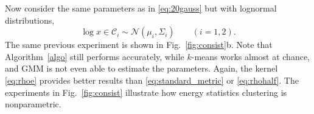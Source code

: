 \documentclass[aps,preprint,nofootinbib,floatfix]{revtex4-1}
\newcommand\C{{\mathcal{C}}}
\begin{document}
Now consider the same parameters as in \eqref{eq:20gauss} but with
lognormal distributions, 
\begin{equation}
\label{eq:20loggauss}
\log x \in \C_i \sim \mathcal{N}(\mu_i, \Sigma_i) \qquad (i=1,2).
\end{equation}
The same previous experiment is shown in 
Fig.~\ref{fig:consist}b.
Note that Algorithm~\ref{algo} still performs accurately, 
while $k$-means works almost at chance,
and GMM is not even able to estimate the parameters. 
Again, the
kernel \eqref{eq:rhoe}
provides better results than \eqref{eq:standard_metric} or
\eqref{eq:rhohalf}. 
The experiments in Fig.~\ref{fig:consist}
illustrate how energy statistics clustering is nonparametric.
\end{document}
